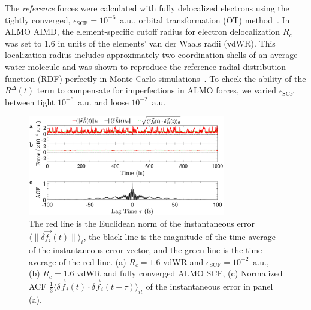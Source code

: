 \documentclass[aps,prl,reprint,amsmath,amssymb]{revtex4-1}
\begin{document}
The \emph{reference} forces were calculated with fully delocalized electrons using the tightly converged, $\epsilon_{\text{SCF}}=10^{-6}$~a.u., orbital transformation (OT) method~\cite{a:ot}. 
In ALMO AIMD, the element-specific cutoff radius for electron delocalization $R_c$ was set to 1.6 in units of the elements' van der Waals radii (vdWR). This localization radius includes approximately two coordination shells of an average water molecule and was shown to reproduce the reference radial distribution function (RDF) perfectly in Monte-Carlo simulations~\cite{a:almo-ls}. 
%
To check the ability of the $R^{\Delta}(t)$ term to compensate for imperfections in ALMO forces, we varied $\epsilon_{\text{SCF}}$ between tight $10^{-6}$~a.u. and loose $10^{-2}$~a.u. 

\begin{figure}
\includegraphics[trim={0.5cm 0cm 0.7cm 0.1cm},clip,width=8.6cm]{DeltaForceComparison_with_ACF.eps}
\caption{\label{fig:randomforce} 
The red line is the Euclidean norm of the instantaneous error $\langle \| \delta \vec{f_{i}}(t) \| \rangle_{i}$, the black line is the magnitude of the time average of the instantaneous error vector, and the green line is the time average of the red line. 
(a) $R_{c} = 1.6$ vdWR and $\epsilon_{\text{SCF}} = 10^{-2}$~a.u., 
(b) $R_{c} = 1.6$ vdWR and fully converged ALMO SCF, 
(c) Normalized ACF $\frac{1}{3}\langle \delta \vec{f}_i (t) \cdot \delta\vec{f}_i(t+\tau) \rangle_{it}$ of the instantaneous error in panel (a).
}
\end{figure}
\end{document}
